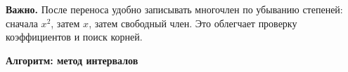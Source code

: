 \documentclass[a4paper,12pt]{article}
\newcommand{\important}[1]{%
  \par\smallskip
  \noindent\textbf{\color{darkaccent}Важно.} #1\par
}
\begin{document}
\important{После переноса удобно записывать многочлен по убыванию степеней: сначала \(x^2\), затем \(x\), затем свободный член. Это облегчает проверку коэффициентов и поиск корней.}

\clearpage
\begingroup
\pdfpagewidth=297mm
\pdfpageheight=420mm
\paperwidth=297mm
\paperheight=420mm
\setlength{\textwidth}{247mm}
\setlength{\linewidth}{247mm}
\setlength{\columnwidth}{247mm}
\hsize=247mm
\setlength{\textheight}{376mm}
\setlength{\oddsidemargin}{-0.4mm}
\setlength{\evensidemargin}{-0.4mm}
\setlength{\topmargin}{-3.4mm}
\setlength{\headheight}{0pt}
\setlength{\headsep}{0pt}
\thispagestyle{empty}
\enlargethispage{120mm}

\begin{center}
{\Large\bfseries\color{darkaccent}Алгоритм: метод интервалов}
\end{center}

\vspace{6mm}
\end{document}
